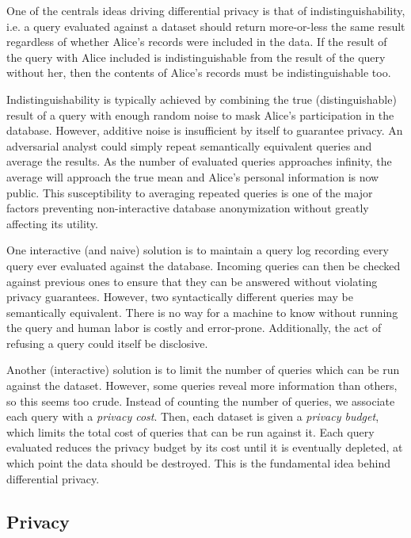 \documentclass[12pt]{report}
\begin{document}
One of the centrals ideas driving differential privacy is that of indistinguishability, i.e. a query evaluated against a dataset should return more-or-less the same result regardless of whether Alice's records were included in the data.
If the result of the query with Alice included is indistinguishable from the result of the query without her, then the contents of Alice's records must be indistinguishable too.

Indistinguishability is typically achieved by combining the true (distinguishable) result of a query with enough random noise to mask Alice's participation in the database.
However, additive noise is insufficient by itself to guarantee privacy.
An adversarial analyst could simply repeat semantically equivalent queries and average the results.
As the number of evaluated queries approaches infinity, the average will approach the true mean and Alice's personal information is now public.
This susceptibility to averaging repeated queries is one of the major factors preventing non-interactive database anonymization without greatly affecting its utility.

One interactive (and naive) solution is to maintain a query log recording every query ever evaluated against the database.
Incoming queries can then be checked against previous ones to ensure that they can be answered without violating privacy guarantees.
However, two syntactically different queries may be semantically equivalent.
There is no way for a machine to know without running the query and human labor is costly and error-prone.
Additionally, the act of refusing a query could itself be disclosive.

Another (interactive) solution is to limit the number of queries which can be run against the dataset.
However, some queries reveal more information than others, so this seems too crude.
Instead of counting the number of queries, we associate each query with a \textit{privacy cost}.
Then, each dataset is given a \textit{privacy budget}, which limits the total cost of queries that can be run against it.
Each query evaluated reduces the privacy budget by its cost until it is eventually depleted, at which point the data should be destroyed.
This is the fundamental idea behind differential privacy.

\subsection{Privacy}\label{subsec:intro-almostperfectpriv}
\end{document}
